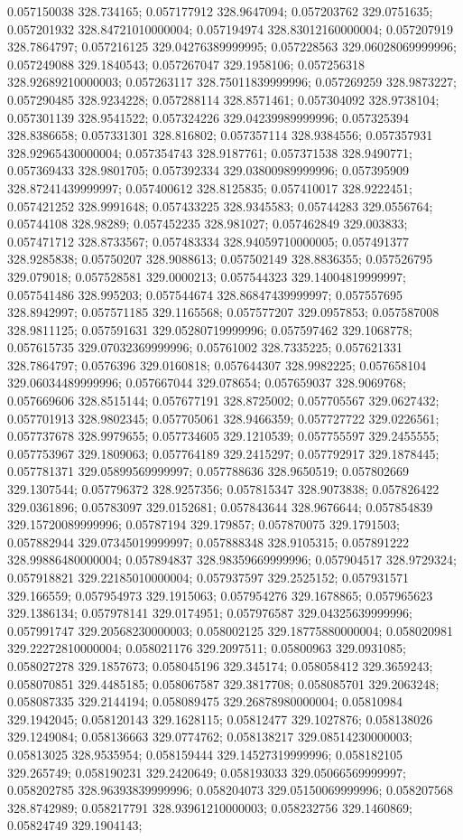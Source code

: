 0.057150038 328.734165; 0.057177912 328.9647094; 0.057203762 329.0751635; 0.057201932 328.84721010000004; 0.057194974 328.83012160000004; 0.057207919 328.7864797; 0.057216125 329.04276389999995; 0.057228563 329.06028069999996; 0.057249088 329.1840543; 0.057267047 329.1958106; 0.057256318 328.92689210000003; 0.057263117 328.75011839999996; 0.057269259 328.9873227; 0.057290485 328.9234228; 0.057288114 328.8571461; 0.057304092 328.9738104; 0.057301139 328.9541522; 0.057324226 329.04239989999996; 0.057325394 328.8386658; 0.057331301 328.816802; 0.057357114 328.9384556; 0.057357931 328.92965430000004; 0.057354743 328.9187761; 0.057371538 328.9490771; 0.057369433 328.9801705; 0.057392334 329.03800989999996; 0.057395909 328.87241439999997; 0.057400612 328.8125835; 0.057410017 328.9222451; 0.057421252 328.9991648; 0.057433225 328.9345583; 0.05744283 329.0556764; 0.05744108 328.98289; 0.057452235 328.981027; 0.057462849 329.003833; 0.057471712 328.8733567; 0.057483334 328.94059710000005; 0.057491377 328.9285838; 0.05750207 328.9088613; 0.057502149 328.8836355; 0.057526795 329.079018; 0.057528581 329.0000213; 0.057544323 329.14004819999997; 0.057541486 328.995203; 0.057544674 328.86847439999997; 0.057557695 328.8942997; 0.057571185 329.1165568; 0.057577207 329.0957853; 0.057587008 328.9811125; 0.057591631 329.05280719999996; 0.057597462 329.1068778; 0.057615735 329.07032369999996; 0.05761002 328.7335225; 0.057621331 328.7864797; 0.0576396 329.0160818; 0.057644307 328.9982225; 0.057658104 329.06034489999996; 0.057667044 329.078654; 0.057659037 328.9069768; 0.057669606 328.8515144; 0.057677191 328.8725002; 0.057705567 329.0627432; 0.057701913 328.9802345; 0.057705061 328.9466359; 0.057727722 329.0226561; 0.057737678 328.9979655; 0.057734605 329.1210539; 0.057755597 329.2455555; 0.057753967 329.1809063; 0.057764189 329.2415297; 0.057792917 329.1878445; 0.057781371 329.05899569999997; 0.057788636 328.9650519; 0.057802669 329.1307544; 0.057796372 328.9257356; 0.057815347 328.9073838; 0.057826422 329.0361896; 0.05783097 329.0152681; 0.057843644 328.9676644; 0.057854839 329.15720089999996; 0.05787194 329.179857; 0.057870075 329.1791503; 0.057882944 329.07345019999997; 0.057888348 328.9105315; 0.057891222 328.99886480000004; 0.057894837 328.98359669999996; 0.057904517 328.9729324; 0.057918821 329.22185010000004; 0.057937597 329.2525152; 0.057931571 329.166559; 0.057954973 329.1915063; 0.057954276 329.1678865; 0.057965623 329.1386134; 0.057978141 329.0174951; 0.057976587 329.04325639999996; 0.057991747 329.20568230000003; 0.058002125 329.18775880000004; 0.058020981 329.22272810000004; 0.058021176 329.2097511; 0.05800963 329.0931085; 0.058027278 329.1857673; 0.058045196 329.345174; 0.058058412 329.3659243; 0.058070851 329.4485185; 0.058067587 329.3817708; 0.058085701 329.2063248; 0.058087335 329.2144194; 0.058089475 329.26878980000004; 0.05810984 329.1942045; 0.058120143 329.1628115; 0.05812477 329.1027876; 0.058138026 329.1249084; 0.058136663 329.0774762; 0.058138217 329.08514230000003; 0.05813025 328.9535954; 0.058159444 329.14527319999996; 0.058182105 329.265749; 0.058190231 329.2420649; 0.058193033 329.05066569999997; 0.058202785 328.96393839999996; 0.058204073 329.05150069999996; 0.058207568 328.8742989; 0.058217791 328.93961210000003; 0.058232756 329.1460869; 0.05824749 329.1904143; 